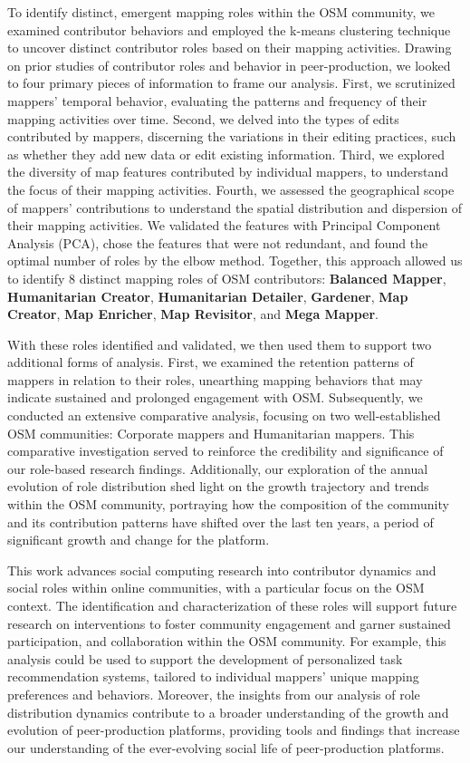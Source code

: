 \documentclass[manuscript,screen,review]{acmart}
\begin{document}
To identify distinct, emergent mapping roles within the OSM community, we examined contributor behaviors and employed the k-means clustering technique to uncover distinct contributor roles based on their mapping activities. Drawing on prior studies of contributor roles and behavior in peer-production\cite{liu11, Veselovsky22, Yang21}, we looked to four primary pieces of information to frame our analysis. First, we scrutinized mappers' temporal behavior, evaluating the patterns and frequency of their mapping activities over time. Second, we delved into the types of edits contributed by mappers, discerning the variations in their editing practices, such as whether they add new data or edit existing information. Third, we explored the diversity of map features contributed by individual mappers, to understand the focus of their mapping activities. Fourth, we assessed the geographical scope of mappers' contributions to understand the spatial distribution and dispersion of their mapping activities. We validated the features with Principal Component Analysis (PCA), chose the features that were not redundant, and found the optimal number of roles by the elbow method. Together, this approach allowed us to identify 8 distinct mapping roles of OSM contributors: \textbf{Balanced Mapper}, \textbf{Humanitarian Creator}, \textbf{Humanitarian Detailer}, \textbf{Gardener}, \textbf{Map Creator}, \textbf{Map Enricher}, \textbf{Map Revisitor}, and \textbf{Mega Mapper}.

With these roles identified and validated, we then used them to support two additional forms of analysis. First, we examined the retention patterns of mappers in relation to their roles, unearthing mapping behaviors that may indicate sustained and prolonged engagement with OSM. Subsequently, we conducted an extensive comparative analysis, focusing on two well-established OSM communities: Corporate mappers\cite{Veselovsky22, Anderson19} and Humanitarian mappers\cite{Hotosm, Mahmud22}. This comparative investigation served to reinforce the credibility and significance of our role-based research findings. Additionally, our exploration of the annual evolution of role distribution shed light on the growth trajectory and trends within the OSM community, portraying how the composition of the community and its contribution patterns have shifted over the last ten years, a period of significant growth and change for the platform.

This work advances social computing research into contributor dynamics and social roles within online communities, with a particular focus on the OSM context. The identification and characterization of these roles will support future research on interventions to foster community engagement and garner sustained participation, and collaboration within the OSM community. For example, this analysis could be used to support the development of personalized task recommendation systems, tailored to individual mappers' unique mapping preferences and behaviors. Moreover, the insights from our analysis of role distribution dynamics contribute to a broader understanding of the growth and evolution of peer-production platforms, providing tools and findings that increase our understanding of the ever-evolving social life of peer-production platforms.
\end{document}
